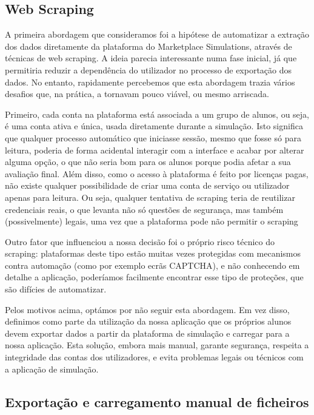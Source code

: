 \subsection{Web Scraping}
A primeira abordagem que consideramos foi a hipótese de automatizar a extração dos dados diretamente da plataforma do Marketplace Simulations, através de técnicas de web scraping. A ideia parecia interessante numa fase inicial, já que permitiria reduzir a dependência do utilizador no processo de exportação  dos dados. No entanto, rapidamente percebemos que esta abordagem trazia vários desafios que, na prática, a tornavam pouco viável, ou mesmo arriscada.

Primeiro, cada conta na plataforma está associada a um grupo de alunos, ou seja, é uma conta ativa e única, usada diretamente durante a simulação. Isto significa que qualquer processo automático que iniciasse sessão, mesmo que fosse só para leitura, poderia de forma acidental interagir com a interface e acabar por alterar alguma opção, o que não seria bom para os alunos porque podia afetar a sua avaliação final. Além disso, como o acesso à plataforma é feito por licenças pagas, não existe qualquer possibilidade de criar uma conta de serviço ou utilizador apenas para leitura. Ou seja, qualquer tentativa de scraping teria de reutilizar credenciais reais, o que levanta não só questões de segurança, mas também (possivelmente) legais, uma vez que a plataforma pode não permitir o scraping

Outro fator que influenciou a nossa decisão foi o próprio risco técnico do scraping: plataformas deste tipo estão muitas vezes protegidas com mecanismos contra automação (como por exemplo ecrãs CAPTCHA), e não conhecendo em detalhe a aplicação, poderíamos facilmente encontrar esse tipo de proteções, que são difícies de automatizar.

Pelos motivos acima, optámos por não seguir esta abordagem. Em vez disso, definimos como parte da utilização da nossa aplicação que os próprios alunos devem exportar dados a partir da plataforma de simulação e carregar para a nossa aplicação. Esta solução, embora mais manual, garante segurança, respeita a integridade das contas dos utilizadores, e evita problemas legais ou técnicos com a aplicação de simulação.

\subsection{Exportação e carregamento manual de ficheiros}

